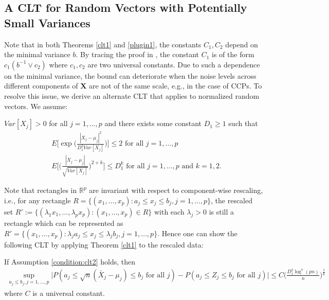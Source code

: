 \documentclass[mnsc,blindrev]{informs4} %
\newcommand{\R}{\mathbb{R}}
\newcommand{\abs}[1]{\left \vert #1 \right\vert}
\begin{document}
\subsection{A CLT for Random Vectors with Potentially Small Variances}\label{clt:adaptation}
Note that in both Theorems \ref{clt1} and \ref{plugin1}, the constants $C_1,C_2$ depend on the minimal variance $b$. By tracing the proof in \cite{chernozhukov2017central}, the constant $C_1$ is of the form $c_1(b^{-1}\vee c_2)$ where $c_1,c_2$ are two universal constants. Due to such a dependence on the minimal variance, the bound can deteriorate when the noise levels across different components of $\mathbf X$ are not of the same scale, e.g., in the case of CCPs. To resolve this issue, we derive an alternate CLT that applies to normalized random vectors.
We assume:
\begin{assumption}\label{condition:clt2}
$Var[X_{j}]>0$ for all $j=1,\ldots,p$ and there exists some constant $D_1\geq 1$ such that
\begin{align}
&E\big[\exp\Big(\frac{\abs{X_{j}-\mu_j}^2}{D_1^2Var[X_j]}\Big)\big]\leq 2\text{ for all }j=1,\ldots,p\label{orlicz}\\
&E\big[\Big(\frac{\abs{X_{j}-\mu_j}}{\sqrt{Var[X_j]}}\Big)^{2+k}\big]\leq D_1^k\text{ for all }j=1,\ldots,p\text{ and }k=1,2.\label{skewness-kurtosis}
\end{align}
\end{assumption}
Note that rectangles in $\R^p$ are invariant with respect to component-wise rescaling, i.e., for any rectangle $R=\{(x_1,\ldots,x_p):a_j\leq x_j\leq b_j,j=1,\ldots,p\}$, the rescaled set $R':=\{(\lambda_1x_1,\ldots,\lambda_px_p):(x_1,\ldots,x_p)\in R\}$ with each $\lambda_j>0$ is still a rectangle which can be represented as $R'=\{(x_1,\ldots,x_p):\lambda_ja_j\leq x_j\leq \lambda_jb_j,j=1,\ldots,p\}$. Hence one can show the following CLT by applying Theorem \ref{clt1} to the rescaled data:
\begin{theorem}\label{clt2}
If Assumption \ref{condition:clt2} holds, then
\begin{align*}
\sup_{a_j\leq b_j,j=1,\ldots,p}\Big\lvert P(a_j\leq \sqrt n(\bar{X}_j-\mu_j)\leq b_j\text{ for all }j)-P(a_j\leq Z_j\leq b_j\text{ for all }j)\Big\rvert\leq C\Big(\frac{D_1^2\log^7(pn)}{n}\Big)^{\frac{1}{6}}
\end{align*}
where $C$ is a universal constant.
\end{theorem}
\end{document}
